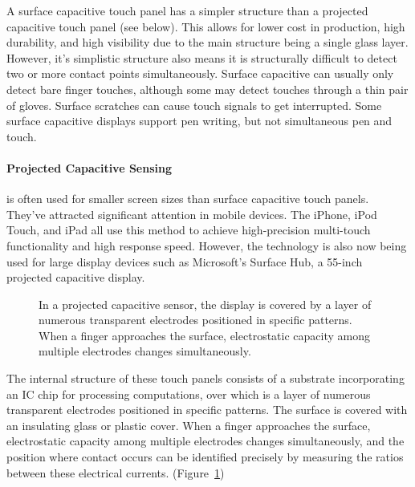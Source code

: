 A surface capacitive touch panel has a simpler structure than a projected capacitive touch panel (see below).
This allows for lower cost in production, high durability, and high visibility due to the main structure being a single glass layer. 
However, it's simplistic structure also means it is structurally difficult to detect two or more contact points simultaneously.
Surface capacitive can usually only detect bare finger touches, although some may detect touches through a thin pair of gloves.
Surface scratches can cause touch signals to get interrupted.
Some surface capacitive displays support pen writing, but not simultaneous pen and touch.

\paragraph{Projected Capacitive Sensing}

is often used for smaller screen sizes than surface capacitive touch panels. 
They've attracted significant attention in mobile devices. 
The iPhone, iPod Touch, and iPad all use this method to achieve high-precision multi-touch functionality and high response speed.
However, the technology is also now being used for large display devices such as Microsoft's Surface Hub, a 55-inch projected capacitive display.

\begin{figure}
\caption[A diagram a projected capacitive sensor]{In a projected capacitive sensor, the display is covered by a layer of numerous transparent electrodes positioned in specific patterns. When a finger approaches the surface, electrostatic capacity among multiple electrodes changes simultaneously. \cite{touchtech}}
\label{fig:projcap}
\end{figure}

The internal structure of these touch panels consists of a substrate incorporating an IC chip for processing computations, over which is a layer of numerous transparent electrodes positioned in specific patterns. 
The surface is covered with an insulating glass or plastic cover. 
When a finger approaches the surface, electrostatic capacity among multiple electrodes changes simultaneously, and the position where contact occurs can be identified precisely by measuring the ratios between these electrical currents. (Figure~\ref{fig:projcap})

